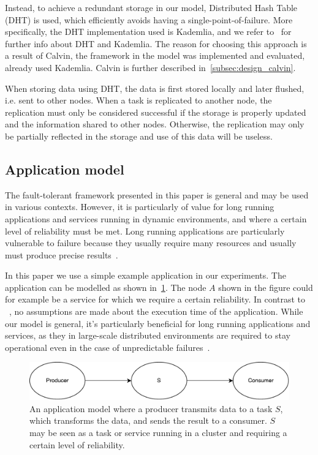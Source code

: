 \documentclass{cslthse-msc}
\begin{document}
Instead, to achieve a redundant storage in our model, Distributed Hash Table (DHT) is used, which efficiently avoids having a single-point-of-failure. More specifically, the DHT implementation used is Kademlia, and we refer to~\cite{kademlia} for further info about DHT and Kademlia. The reason for choosing this approach is a result of Calvin, the framework in the model was implemented and evaluated, already used Kademlia. Calvin is further described in~\cref{subsec:design_calvin}.

When storing data using DHT, the data is first stored locally and later flushed, i.e. sent to other nodes. When a task is replicated to another node, the replication must only be considered successful if the storage is properly updated and the information shared to other nodes. Otherwise, the replication may only be partially reflected in the storage and use of this data will be useless. 

\subsection{Application model} \label{subsec:design_app_model}
The fault-tolerant framework presented in this paper is general and may be used in various contexts. However, it is particularly of value for long running applications and services running in dynamic environments, and where a certain level of reliability must be met. Long running applications are particularly vulnerable to failure because they usually require many resources and usually must produce precise results~\cite{relGridSystems}.

In this paper we use a simple example application in our experiments. The application can be modelled as shown in~\cref{fig:app_model}. The node $A$ shown in the figure could for example be a service for which we require a certain reliability. In contrast to ~\cite{algoOptTimeMaxRel, optTaskAllocationForMaxRel, taskAllocation, taskAllocationSwarm, algoMaxRelEndToEndConstraint, algoMinExTime, schedReplicas}, no assumptions are made about the execution time of the application. While our model is general, it's particularly beneficial for long running applications and services, as they in large-scale distributed environments are required to stay operational even in the case of unpredictable failures~\cite{imprRelAdaptRL}.

\begin{figure}[!hbt]
\centering
\includegraphics[scale=0.5]{images/app_model.pdf} 
\caption{An application model where a producer transmits data to a task $S$, which transforms the data, and sends the result to a consumer. $S$ may be seen as a task or service running in a cluster and requiring a certain level of reliability.}\label{fig:app_model}
\end{figure}
\end{document}
